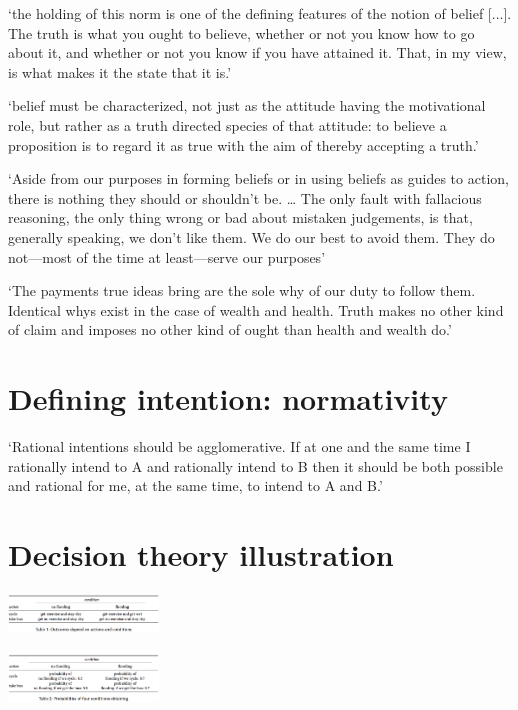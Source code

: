 \documentclass[11pt]{extarticle}
\begin{document}
\begin{multicols}{3}
‘the holding of this norm is one of the defining features of the notion of belief [...]. The truth is what you ought to believe, whether or not you know how to go about it, and whether or not you know if you have attained it. That, in my view, is what makes it the state that it is.’\citep{boghossian:2003_normativity} %

`belief must be characterized, not just as the attitude having the motivational role, but rather as a truth directed species of that attitude: to believe a proposition is to regard it as true with the aim of thereby accepting a truth.'\citep{Velleman:2000fq} %

‘Aside from our purposes in forming beliefs or in using beliefs as guides to action, there is nothing they should or shouldn’t be.  …  The only fault with fallacious reasoning, the only thing wrong or bad about mistaken judgements, is that, generally speaking, we don’t like them.  We do our best to avoid them.  They do not—most of the time at least—serve our purposes’\citep{Dretske:2000ky} %

‘The payments true ideas bring are the sole why of our duty to follow them.  Identical whys exist in the case of wealth and health.  Truth makes no other kind of claim and imposes no other kind of ought than health and wealth do.’\citep{James:1907ae} %

\section{Defining intention: normativity}
`Rational intentions should be agglomerative. If at one and the same time I rationally intend to A and rationally intend to B then it should be both possible and rational for me, at the same time, to intend to A and B.'\citep{bratman_faces_1999} %
 

\section{Decision theory illustration}
 
\begin{center}
  \includegraphics[width=0.3\textwidth]{table1.png}
\end{center}

\begin{center}
  \includegraphics[width=0.3\textwidth]{table2.png}
\end{center}


\end{multicols}
\end{document}
